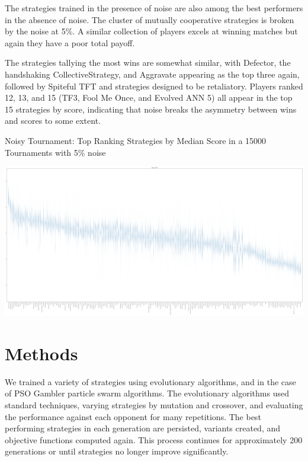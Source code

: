 \documentclass{article}
\begin{document}
The strategies trained in the presence of noise are also among the best performers
in the absence of noise. The cluster of mutually cooperative strategies is
broken by the noise at 5\%. A similar collection of players excels at winning
matches but again they have a poor total payoff.

The strategies tallying the most wins are somewhat similar, with Defector, the
handshaking CollectiveStrategy, and Aggravate appearing as the top three again,
followed by Spiteful TFT and strategies designed to be retaliatory. Players ranked
12, 13, and 15 (TF3, Fool Me Once, and Evolved ANN 5) all appear in the top 15
strategies by score, indicating that noise breaks the asymmetry between wins
and scores to some extent.


\begin{table}[!hbtp]
    \centering
        
        \caption{Noisy Tournament: Top Ranking Strategies by Median Score in a
        15000 Tournaments with 5\% noise}
        \label{tbl:noisy_score}
\end{table}


\begin{landscape}
    \includegraphics[width=\paperwidth]{plots/Noisy_boxplot.pdf}
\end{landscape}

\section{Methods}

We trained a variety of strategies using evolutionary algorithms, and in the
case of PSO Gambler particle swarm algorithms. The evolutionary algorithms
used standard techniques, varying strategies by mutation and crossover, and
evaluating the performance against each opponent for many repetitions. The
best performing strategies in each generation are persisted, variants created,
and objective functions computed again. This process continues for approximately
200 generations or until strategies no longer improve significantly.
\end{document}
